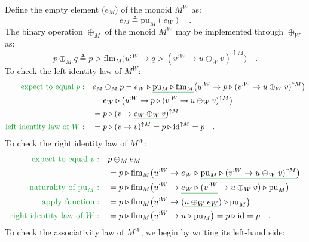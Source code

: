 Define the empty element ($e_{M}$) of the monoid $M^{W}$ as:
\[
e_{M}\triangleq\text{pu}_{M}(e_{W})\quad.
\]
The binary operation $\oplus_{M}$ of the monoid $M^{W}$ may be implemented
through $\oplus_{W}$ as:
\[
p\oplus_{M}q\triangleq p\triangleright\text{flm}_{M}\big(u^{:W}\rightarrow q\triangleright(v^{:W}\rightarrow u\oplus_{W}v)^{\uparrow M}\big)\quad.
\]
To check the left identity law of $M^{W}$:
\begin{align*}
{\color{greenunder}\text{expect to equal }p:}\quad & e_{M}\oplus_{M}p=e_{W}\triangleright\gunderline{\text{pu}_{M}\triangleright\text{flm}_{M}}\big(u^{:W}\rightarrow p\triangleright(v^{:W}\rightarrow u\oplus_{W}v)^{\uparrow M}\big)\\
 & =e_{W}\triangleright\big(u^{:W}\rightarrow p\triangleright(v^{:W}\rightarrow u\oplus_{W}v)^{\uparrow M}\big)\\
 & =p\triangleright(v\rightarrow\gunderline{e_{W}\oplus_{W}v})^{\uparrow M}\\
{\color{greenunder}\text{left identity law of }W:}\quad & =p\triangleright(v\rightarrow v)^{\uparrow M}=p\triangleright\text{id}^{\uparrow M}=p\quad.
\end{align*}
To check the right identity law of $M^{W}$:
\begin{align*}
{\color{greenunder}\text{expect to equal }p:}\quad & p\oplus_{M}e_{M}\\
 & =p\triangleright\text{flm}_{M}\big(u^{:W}\rightarrow e_{W}\triangleright\gunderline{\text{pu}_{M}\triangleright(v^{:W}\rightarrow u\oplus_{W}v)^{\uparrow M}}\big)\\
{\color{greenunder}\text{naturality of }\text{pu}_{M}:}\quad & =p\triangleright\text{flm}_{M}\big(u^{:W}\rightarrow\gunderline{e_{W}\triangleright(v^{:W}}\rightarrow u\oplus_{W}v)\triangleright\text{pu}_{M}\big)\\
{\color{greenunder}\text{apply function}:}\quad & =p\triangleright\text{flm}_{M}\big(u^{:W}\rightarrow(\gunderline{u\oplus_{W}e_{W}})\triangleright\text{pu}_{M}\big)\\
{\color{greenunder}\text{right identity law of }W:}\quad & =p\triangleright\text{flm}_{M}\big(u^{:W}\rightarrow u\triangleright\text{pu}_{M}\big)=p\triangleright\text{id}=p\quad.
\end{align*}
To check the associativity law of $M^{W}$, we begin by writing its
left-hand side:
